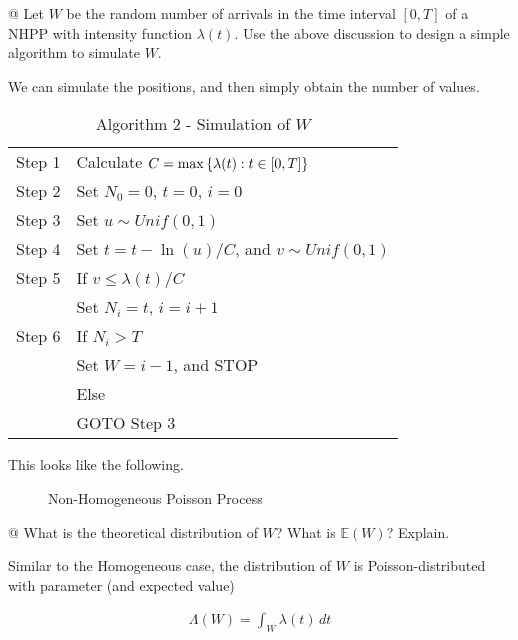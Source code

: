 \documentclass[10pt]{article}
\begin{document}
\begin{easylist}[enumerate]
    @ Let $W$ be the random number of arrivals in the time interval $[0, T]$ of
    a NHPP with intensity function $\lambda(t)$. Use the above discussion to
    design a simple algorithm to simulate $W$.

    \p We can simulate the positions, and then simply obtain the number of
    values.

    \begin{table}[H]
        \centering
        \begin{tabular}{|l|l|}
            \hline
            Step 1 & Calculate $C = \max\left\{ \lambda(t): t \in [0,T] \right\}$\\
            Step 2 & Set $N_0 = 0$, $t = 0$, $i=0$\\
            Step 3 & Set $u \sim Unif(0, 1)$\\
            Step 4 & Set $t = t - \ln(u) / C$, and $v \sim Unif(0, 1)$\\
            Step 5 & If $v \le \lambda(t) / C$\\
            & \hspace{1cm} Set $N_i = t$, $i = i + 1$\\
            Step 6 & If $N_i > T$\\
            & \hspace{1cm} Set $W = i - 1$, and STOP\\
            & Else\\
            & \hspace{1cm} GOTO Step 3\\
            \hline
        \end{tabular}
        \caption{Algorithm 2 - Simulation of $W$}
    \end{table}

    This looks like the following.

    \begin{figure}
        \centering
        \caption{Non-Homogeneous Poisson Process}
    \end{figure}

    @ What is the theoretical distribution of $W$? What is $\mathbb{E}(W)$?
    Explain.

    \p Similar to the Homogeneous case, the distribution of $W$ is
    Poisson-distributed with parameter (and expected value)

    \begin{align*}
        \Lambda(W) = \int_W \lambda(t) \, dt
    \end{align*}


\end{easylist}
\end{document}
